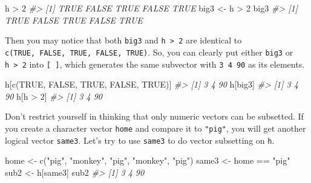 \documentclass[
]{book}
\newenvironment{Shaded}{\begin{snugshade}}{\end{snugshade}}
\newcommand{\CommentTok}[1]{\textcolor[rgb]{0.56,0.35,0.01}{\textit{#1}}}
\newcommand{\ConstantTok}[1]{\textcolor[rgb]{0.00,0.00,0.00}{#1}}
\newcommand{\DecValTok}[1]{\textcolor[rgb]{0.00,0.00,0.81}{#1}}
\newcommand{\FunctionTok}[1]{\textcolor[rgb]{0.00,0.00,0.00}{#1}}
\newcommand{\NormalTok}[1]{#1}
\newcommand{\OtherTok}[1]{\textcolor[rgb]{0.56,0.35,0.01}{#1}}
\newcommand{\SpecialCharTok}[1]{\textcolor[rgb]{0.00,0.00,0.00}{#1}}
\newcommand{\StringTok}[1]{\textcolor[rgb]{0.31,0.60,0.02}{#1}}
\begin{document}
\begin{Shaded}
\begin{Highlighting}[]
\NormalTok{h }\SpecialCharTok{\textgreater{}} \DecValTok{2}
\CommentTok{\#\textgreater{} [1]  TRUE FALSE  TRUE FALSE  TRUE}
\NormalTok{big3 }\OtherTok{\textless{}{-}}\NormalTok{ h }\SpecialCharTok{\textgreater{}} \DecValTok{2}
\NormalTok{big3}
\CommentTok{\#\textgreater{} [1]  TRUE FALSE  TRUE FALSE  TRUE}
\end{Highlighting}
\end{Shaded}

Then you may notice that both \texttt{big3} and \texttt{h\ \textgreater{}\ 2} are identical to \texttt{c(TRUE,\ FALSE,\ TRUE,\ FALSE,\ TRUE)}. So, you can clearly put either \texttt{big3} or \texttt{h\ \textgreater{}\ 2} into \texttt{{[}\ {]}}, which generates the same subvector with \texttt{3\ 4\ 90} as its elements.

\begin{Shaded}
\begin{Highlighting}[]
\NormalTok{h[}\FunctionTok{c}\NormalTok{(}\ConstantTok{TRUE}\NormalTok{, }\ConstantTok{FALSE}\NormalTok{, }\ConstantTok{TRUE}\NormalTok{, }\ConstantTok{FALSE}\NormalTok{, }\ConstantTok{TRUE}\NormalTok{)]}
\CommentTok{\#\textgreater{} [1]  3  4 90}
\NormalTok{h[big3]}
\CommentTok{\#\textgreater{} [1]  3  4 90}
\NormalTok{h[h }\SpecialCharTok{\textgreater{}} \DecValTok{2}\NormalTok{]}
\CommentTok{\#\textgreater{} [1]  3  4 90}
\end{Highlighting}
\end{Shaded}

Don't restrict yourself in thinking that only numeric vectors can be subsetted. If you create a character vector \texttt{home} and compare it to \texttt{"pig"}, you will get another logical vector \texttt{same3}. Let's try to use \texttt{same3} to do vector subsetting on \texttt{h}.

\begin{Shaded}
\begin{Highlighting}[]
\NormalTok{home }\OtherTok{\textless{}{-}} \FunctionTok{c}\NormalTok{(}\StringTok{"pig"}\NormalTok{, }\StringTok{"monkey"}\NormalTok{, }\StringTok{"pig"}\NormalTok{, }\StringTok{"monkey"}\NormalTok{, }\StringTok{"pig"}\NormalTok{)}
\NormalTok{same3 }\OtherTok{\textless{}{-}}\NormalTok{ home }\SpecialCharTok{==} \StringTok{"pig"}
\NormalTok{sub2 }\OtherTok{\textless{}{-}}\NormalTok{ h[same3]}
\NormalTok{sub2}
\CommentTok{\#\textgreater{} [1]  3  4 90}
\end{Highlighting}
\end{Shaded}
\end{document}
